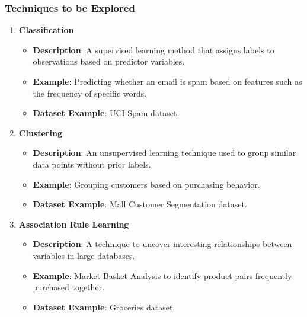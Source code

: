 \documentclass[aspectratio=169]{beamer}
\begin{document}
\begin{frame}
    \frametitle{Techniques to be Explored}
    \begin{enumerate}
        \item \textbf{Classification}
        \begin{itemize}
            \item \textbf{Description}: A supervised learning method that assigns labels to observations based on predictor variables.
            \item \textbf{Example}: Predicting whether an email is spam based on features such as the frequency of specific words.
            \item \textbf{Dataset Example}: UCI Spam dataset.
        \end{itemize}
        
        \item \textbf{Clustering}
        \begin{itemize}
            \item \textbf{Description}: An unsupervised learning technique used to group similar data points without prior labels.
            \item \textbf{Example}: Grouping customers based on purchasing behavior.
            \item \textbf{Dataset Example}: Mall Customer Segmentation dataset.
        \end{itemize}
        
        \item \textbf{Association Rule Learning}
        \begin{itemize}
            \item \textbf{Description}: A technique to uncover interesting relationships between variables in large databases.
            \item \textbf{Example}: Market Basket Analysis to identify product pairs frequently purchased together.
            \item \textbf{Dataset Example}: Groceries dataset.
        \end{itemize}
    \end{enumerate}
\end{frame}
\end{document}
